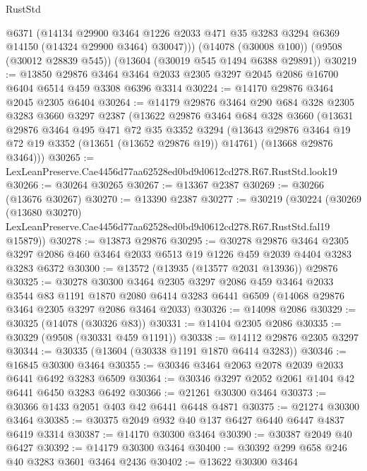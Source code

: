 \begin{lexlean}{RustStd}
\begin{coremodule}
        @6371
        (@14134
          @29900
          @3464
          @1226
          @2033
          @471
          @35
          @3283
          @3294
          @6369
          @14150
          (@14324 @29900 @3464)
          @30047)))
    (@14078 (@30008 @100))
    (@9508 (@30012 @28839 @545))
    (@13604 (@30019 @545 @1494 @6388 @29891))
@30219 := @13850
    @29876
    @3464
    @3464
    @2033
    @2305
    @3297
    @2045
    @2086
    @16700
    @6404
    @6514
    @459
    @3308
    @6396
    @3314
@30224 := @14170 @29876 @3464 @2045 @2305 @6404
@30264 := @14179
    @29876
    @3464
    @290
    @684
    @328
    @2305
    @3283
    @3660
    @3297
    @2387
    (@13622
      @29876
      @3464
      @684
      @328
      @3660
      (@13631
        @29876
        @3464
        @495
        @471
        @72
        @35
        @3352
        @3294
        (@13643 @29876 @3464 @19 @72 @19 @3352 (@13651 (@13652 @29876 @19)) @14761)
        (@13668 @29876 @3464)))
@30265 := LexLeanPreserve.Cae4456d77aa62528ed0bd9d0612cd278.R67.RustStd.look19
@30266 := @30264 @30265
@30267 := @13367 @2387
@30269 := @30266 (@13676 @30267)
@30270 := @13390 @2387
@30277 := @30219
    (@30224
      (@30269
        (@13680 @30270)
        LexLeanPreserve.Cae4456d77aa62528ed0bd9d0612cd278.R67.RustStd.fal19
        @15879))
@30278 := @13873 @29876
@30295 := @30278
    @29876
    @3464
    @2305
    @3297
    @2086
    @460
    @3464
    @2033
    @6513
    @19
    @1226
    @459
    @2039
    @4404
    @3283
    @3283
    @6372
@30300 := @13572 (@13935 (@13577 @2031 @13936)) @29876
@30325 := @30278
    @30300
    @3464
    @2305
    @3297
    @2086
    @459
    @3464
    @2033
    @3544
    @83
    @1191
    @1870
    @2080
    @6414
    @3283
    @6441
    @6509
    (@14068 @29876 @3464 @2305 @3297 @2086 @3464 @2033)
@30326 := @14098 @2086
@30329 := @30325 (@14078 (@30326 @83))
@30331 := @14104 @2305 @2086
@30335 := @30329 (@9508 (@30331 @459 @1191))
@30338 := @14112 @29876 @2305 @3297
@30344 := @30335 (@13604 (@30338 @1191 @1870 @6414 @3283))
@30346 := @16845 @30300 @3464
@30355 := @30346 @3464 @2063 @2078 @2039 @2033 @6441 @6492 @3283 @6509
@30364 := @30346 @3297 @2052 @2061 @1404 @42 @6441 @6450 @3283 @6492
@30366 := @21261 @30300 @3464
@30373 := @30366 @1433 @2051 @403 @42 @6441 @6448 @4871
@30375 := @21274 @30300 @3464
@30385 := @30375 @2049 @932 @40 @137 @6427 @6440 @6447 @4837 @6419 @3314
@30387 := @14170 @30300 @3464
@30390 := @30387 @2049 @40 @6427
@30392 := @14179 @30300 @3464
@30400 := @30392 @299 @658 @246 @40 @3283 @3601 @3464 @2436
@30402 := @13622 @30300 @3464

\end{coremodule}
\end{lexlean}
